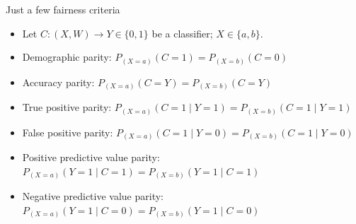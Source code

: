 \documentclass[12pt,t,handout]{beamer}
\begin{document}

\begin{frame}[c]{Just a few fairness criteria}

\begin{center}
\begin{itemize}
  \itemsep8pt
  \item Let $C: (X, W) \to Y \in \{0, 1\}$ be a classifier; $X \in \{a, b\}$.
  \item Demographic parity: $P_{(X = a)}(C = 1) = P_{(X = b)}(C = 0)$
  \item Accuracy parity: $P_{(X = a)}(C = Y) = P_{(X = b)}(C = Y)$
  \item True positive parity: $P_{(X = a)}(C = 1 \mid Y = 1) = P_{(X = b)}(C =
    1 \mid Y = 1)$
  \item False positive parity: $P_{(X = a)}(C = 1 \mid Y = 0) = P_{(X = b)}(C =
    1 \mid Y = 0)$
  \item Positive predictive value parity: $P_{(X = a)}(Y = 1 \mid C = 1) =
    P_{(X = b)}(Y = 1 \mid C = 1)$
  \item Negative predictive value parity: $P_{(X = a)}(Y = 1 \mid C = 0) =
    P_{(X = b)}(Y = 1 \mid C = 0)$
\end{itemize}
\end{center}


\end{frame}

\end{document}
